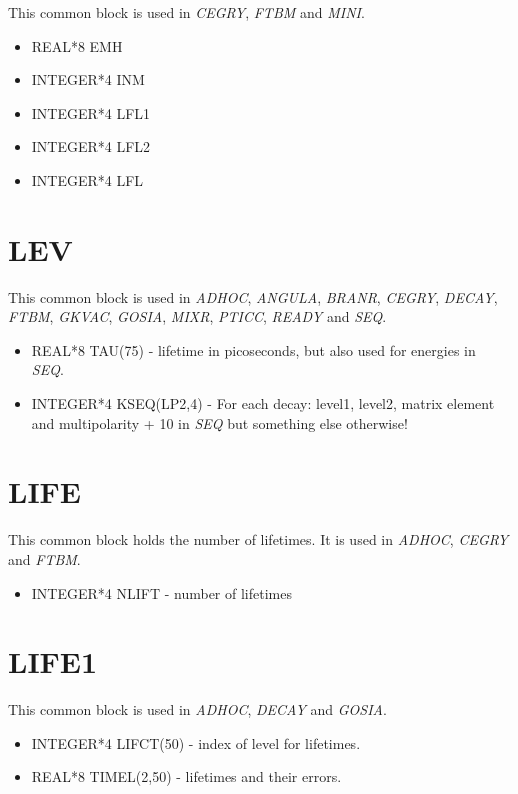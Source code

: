 This common block is used in \emph{CEGRY}, \emph{FTBM} and \emph{MINI}.

\begin{itemize}
\item REAL*8 EMH
\item INTEGER*4 INM
\item INTEGER*4 LFL1
\item INTEGER*4 LFL2
\item INTEGER*4 LFL
\end{itemize}

\section{LEV}

This common block is used in \emph{ADHOC}, \emph{ANGULA}, \emph{BRANR}, \emph{
CEGRY}, \emph{DECAY}, \emph{FTBM}, \emph{GKVAC}, \emph{GOSIA}, \emph{MIXR}, \emph{
PTICC}, \emph{READY} and \emph{SEQ}.

\begin{itemize}
\item REAL*8 TAU(75) - lifetime in picoseconds, but also used for energies
in \emph{SEQ}.
\item INTEGER*4 KSEQ(LP2,4) - For each decay: level1, level2, matrix element
and multipolarity + 10 in \emph{SEQ} but something else otherwise!
\end{itemize}

\section{LIFE}

This common block holds the number of lifetimes. It is used in \emph{ADHOC},
\emph{CEGRY} and \emph{FTBM}.

\begin{itemize}
\item INTEGER*4 NLIFT - number of lifetimes
\end{itemize}

\section{LIFE1}

This common block is used in \emph{ADHOC}, \emph{DECAY} and \emph{GOSIA}.

\begin{itemize}
\item INTEGER*4 LIFCT(50) - index of level for lifetimes.
\item REAL*8 TIMEL(2,50) - lifetimes and their errors.
\end{itemize}

